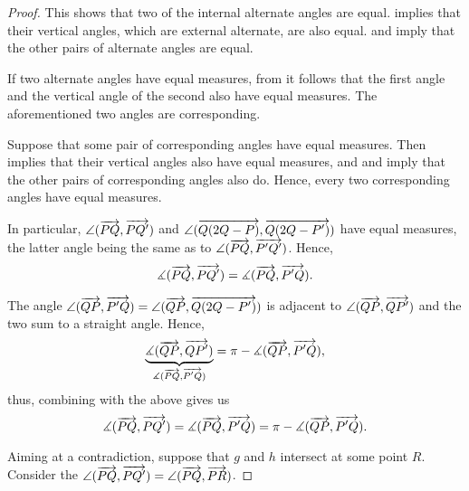 \begin{proof}
  This shows that two of the internal alternate angles are equal.  implies that their vertical angles, which are external alternate, are also equal.  and  imply that the other pairs of alternate angles are equal.

   If two alternate angles have equal measures, from  it follows that the first angle and the vertical angle of the second also have equal measures. The aforementioned two angles are corresponding.

   Suppose that some pair of corresponding angles have equal measures. Then  implies that their vertical angles also have equal measures, and  and  imply that the other pairs of corresponding angles also do. Hence, every two corresponding angles have equal measures.

  In particular, \( \angle(\overrightarrow{PQ}, \overrightarrow{PQ'}) \) and \( \angle(\overrightarrow{Q(2Q - P)}, \overrightarrow{Q(2Q - P')}) \) have equal measures, the latter angle being the same as to \( \angle(\overrightarrow{PQ}, \overrightarrow{P'Q'}) \). Hence,
  \begin{equation*}
    \measuredangle(\overrightarrow{PQ}, \overrightarrow{PQ'}) = \measuredangle(\overrightarrow{PQ}, \overrightarrow{P'Q}).
  \end{equation*}

  The angle \( \angle(\overrightarrow{QP}, \overrightarrow{P'Q}) = \angle(\overrightarrow{QP}, \overrightarrow{Q(2Q - P')}) \) is adjacent to \( \angle(\overrightarrow{QP}, \overrightarrow{QP'}) \) and the two sum to a straight angle. Hence,
  \begin{equation*}
    \underbrace{\measuredangle(\overrightarrow{QP}, \overrightarrow{QP'})}_{\measuredangle(\overrightarrow{PQ}, \overrightarrow{P'Q})} = \pi - \measuredangle(\overrightarrow{QP}, \overrightarrow{P'Q}),
  \end{equation*}
  thus, combining with the above gives us
  \begin{equation*}
    \measuredangle(\overrightarrow{PQ}, \overrightarrow{PQ'}) = \measuredangle(\overrightarrow{PQ}, \overrightarrow{P'Q}) = \pi - \measuredangle(\overrightarrow{QP}, \overrightarrow{P'Q}).
  \end{equation*}

  Aiming at a contradiction, suppose that \( g \) and \( h \) intersect at some point \( R \). Consider the \( \angle(\overrightarrow{PQ}, \overrightarrow{PQ'}) = \angle(\overrightarrow{PQ}, \overrightarrow{PR}) \).


\end{proof}
